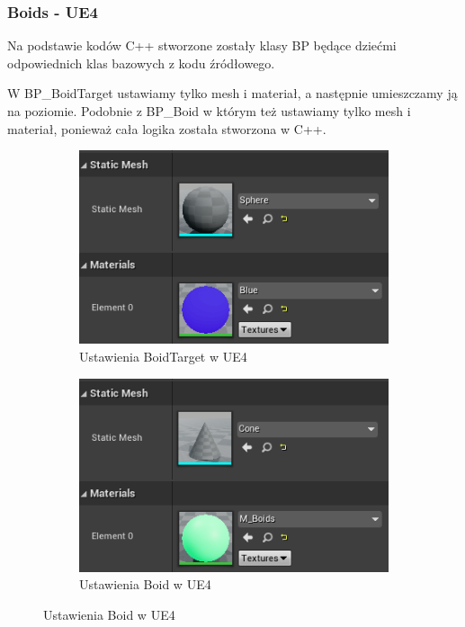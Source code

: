 \documentclass[a4paper,12pt,reqno]{article}
\begin{document}


\subsubsection{Boids - UE4}

Na podstawie kodów C++ stworzone zostały klasy BP będące dziećmi odpowiednich klas bazowych z kodu źródłowego. 

W BP\_BoidTarget ustawiamy tylko mesh i materiał, a następnie umieszczamy ją na poziomie. Podobnie z BP\_Boid w którym też ustawiamy tylko mesh i materiał, ponieważ cała logika została stworzona w C++.

\begin{figure}[H]%
	\centering
	\begin{subfigure}{.5\textwidth}
		\centering
		\includegraphics[width=0.8\linewidth]{graphics//boids/BP_BoidTarget.png}
		\caption{Ustawienia BoidTarget w UE4 }	
		\label{ref:subref_a}
	\end{subfigure}%
	\begin{subfigure}{.5\textwidth}
		\centering
		\includegraphics[width=0.8\linewidth]{graphics//boids/BP_Boid.png}
		\caption{Ustawienia Boid w UE4 }
		\label{ref:subref_b}
	\end{subfigure}%
\label{ref:ref}
\end{figure}
\end{document}

